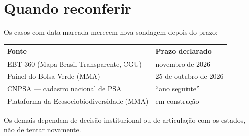 \documentclass[11pt,a4paper]{article}
\begin{document}
\section*{Quando reconferir}

Os casos com data marcada merecem nova sondagem depois do prazo:

\begin{center}
\begin{tabular}{L{7cm} L{6.5cm}}
\toprule
\textbf{Fonte} & \textbf{Prazo declarado} \\
\midrule
EBT 360 (Mapa Brasil Transparente, CGU) & novembro de 2026 \\
Painel do Bolsa Verde (MMA) & 25 de outubro de 2026 \\
CNPSA --- cadastro nacional de PSA & ``ano seguinte'' \\
Plataforma da Ecosociobiodiversidade (MMA) & em construção \\
\bottomrule
\end{tabular}
\end{center}

Os demais dependem de decisão institucional ou de articulação com os estados, não de
tentar novamente.
\end{document}
